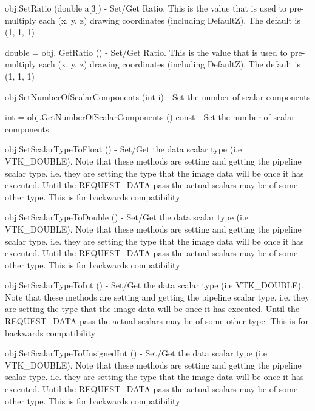 \begin{DoxyItemize}
\item {\ttfamily obj.\-Set\-Ratio (double a\mbox{[}3\mbox{]})} -\/ Set/\-Get Ratio. This is the value that is used to pre-\/multiply each (x, y, z) drawing coordinates (including Default\-Z). The default is (1, 1, 1)  
\item {\ttfamily double = obj. Get\-Ratio ()} -\/ Set/\-Get Ratio. This is the value that is used to pre-\/multiply each (x, y, z) drawing coordinates (including Default\-Z). The default is (1, 1, 1)  
\item {\ttfamily obj.\-Set\-Number\-Of\-Scalar\-Components (int i)} -\/ Set the number of scalar components  
\item {\ttfamily int = obj.\-Get\-Number\-Of\-Scalar\-Components () const} -\/ Set the number of scalar components  
\item {\ttfamily obj.\-Set\-Scalar\-Type\-To\-Float ()} -\/ Set/\-Get the data scalar type (i.\-e V\-T\-K\-\_\-\-D\-O\-U\-B\-L\-E). Note that these methods are setting and getting the pipeline scalar type. i.\-e. they are setting the type that the image data will be once it has executed. Until the R\-E\-Q\-U\-E\-S\-T\-\_\-\-D\-A\-T\-A pass the actual scalars may be of some other type. This is for backwards compatibility  
\item {\ttfamily obj.\-Set\-Scalar\-Type\-To\-Double ()} -\/ Set/\-Get the data scalar type (i.\-e V\-T\-K\-\_\-\-D\-O\-U\-B\-L\-E). Note that these methods are setting and getting the pipeline scalar type. i.\-e. they are setting the type that the image data will be once it has executed. Until the R\-E\-Q\-U\-E\-S\-T\-\_\-\-D\-A\-T\-A pass the actual scalars may be of some other type. This is for backwards compatibility  
\item {\ttfamily obj.\-Set\-Scalar\-Type\-To\-Int ()} -\/ Set/\-Get the data scalar type (i.\-e V\-T\-K\-\_\-\-D\-O\-U\-B\-L\-E). Note that these methods are setting and getting the pipeline scalar type. i.\-e. they are setting the type that the image data will be once it has executed. Until the R\-E\-Q\-U\-E\-S\-T\-\_\-\-D\-A\-T\-A pass the actual scalars may be of some other type. This is for backwards compatibility  
\item {\ttfamily obj.\-Set\-Scalar\-Type\-To\-Unsigned\-Int ()} -\/ Set/\-Get the data scalar type (i.\-e V\-T\-K\-\_\-\-D\-O\-U\-B\-L\-E). Note that these methods are setting and getting the pipeline scalar type. i.\-e. they are setting the type that the image data will be once it has executed. Until the R\-E\-Q\-U\-E\-S\-T\-\_\-\-D\-A\-T\-A pass the actual scalars may be of some other type. This is for backwards compatibility  

\end{DoxyItemize}
